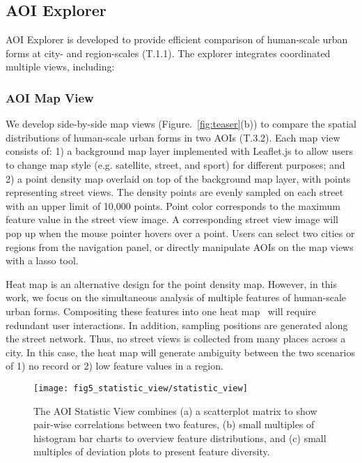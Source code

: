\subsection{AOI Explorer}
\label{ssec:aoi_explorer}
AOI Explorer is developed to provide efficient comparison of human-scale urban forms at city- and region-scales (T.1.1).
The explorer integrates coordinated multiple views, including:

\subsubsection{AOI Map View}
\label{sssec:aoi_map_view}

We develop side-by-side map views (Figure.~\ref{fig:teaser}(b)) to compare the spatial distributions of human-scale urban forms in two AOIs (T.3.2).
Each map view consists of:
1) a background map layer implemented with Leaflet.js to allow users to change map style (e.g. satellite, street, and sport) for different purposes;
and 2) a point density map overlaid on top of the background map layer, with points representing street views.
The density points are evenly sampled on each street with an upper limit of 10,000 points.
Point color corresponds to the maximum feature value in the street view image.
A corresponding street view image will pop up when the mouse pointer hovers over a point.
Users can select two cities or regions from the navigation panel, or directly manipulate AOIs on the map views with a lasso tool.

Heat map is an alternative design for the point density map.
However, in this work, we focus on the simultaneous analysis of multiple features of human-scale urban forms.
Compositing these features into one heat map~\cite{scheepens_2011_composite} will require redundant user interactions.
In addition, sampling positions are generated along the street network.
Thus, no street views is collected from many places across a city.
In this case, the heat map will generate ambiguity between the two scenarios of 1) no record or 2) low feature values in a region.

\begin{figure}[t]
	\centering
	\texttt{[image: fig5\_statistic\_view/statistic\_view]}
	\vspace{-4mm}
	\caption{The AOI Statistic View combines (a) a scatterplot matrix to show pair-wise correlations between two features, (b) small multiples of histogram bar charts to overview feature distributions, and (c) small multiples of deviation plots to present feature diversity. }
	\label{fig:statistic_view}
	\vspace{-4mm}
\end{figure}

